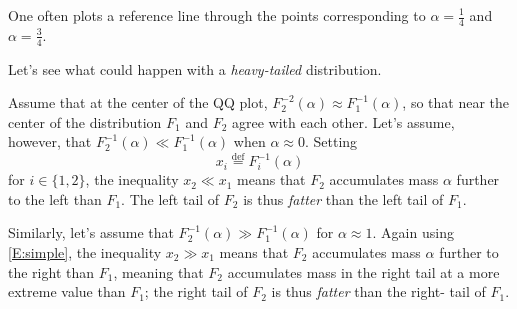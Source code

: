 \documentclass{beamer}
\theoremstyle{plain}
\newcommand{\Def}{\overset{\text{def}}{=}}
\begin{document}
\begin{frame}
One often plots a reference line through the points corresponding to $\alpha=\tfrac14$ and $\alpha=\tfrac34$.
\end{frame}

\begin{frame}
Let's see what could happen with a \emph{heavy-tailed} distribution.

Assume that at the center of the QQ plot, $F_2^{-2}(\alpha)\approx F_1^{-1}(\alpha)$, so that near the center of the distribution $F_1$ and $F_2$ agree with each other.  Let's assume, however, that $F_2^{-1}(\alpha)\ll F_1^{-1}(\alpha)$ when $\alpha \approx 0$.  Setting
\begin{equation*} x_i\Def F_i^{-1}(\alpha) \end{equation*}
for $i\in \{1,2\}$, the inequality $x_2\ll x_1$ means that $F_2$ accumulates mass $\alpha$ further to the left than $F_1$.  The left tail of $F_2$ is thus \emph{fatter} than the left tail of $F_1$.

Similarly, let's assume that $F_2^{-1}(\alpha)\gg F_1^{-1}(\alpha)$ for $\alpha \approx 1$.
Again using \eqref{E:simple}, the inequality $x_2\gg x_1$ means that $F_2$ accumulates mass $\alpha$ further to the right than $F_1$, meaning that $F_2$ accumulates mass in the right tail at a more extreme value than $F_1$; the right tail of $F_2$ is thus \emph{fatter} than the right- tail of $F_1$.
\end{frame}
\end{document}

